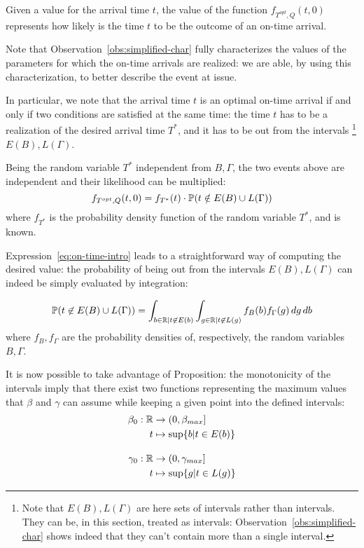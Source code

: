 Given a value for the arrival time \(t\),
the value of the function \(f_{T^{opt}, Q}(t, 0)\) represents how likely is the time \(t\) to be the outcome of an on-time arrival.

Note that Observation~\ref{obs:simplified-char} fully characterizes the values of the parameters for which the on-time arrivals are realized:
we are able, by using this characterization, to better describe the event at issue.

In particular, we note that the arrival time \(t\) is an optimal on-time arrival if and only if two conditions are satisfied at the same time:
the time \(t\) has to be a realization of the desired arrival time \(T^*\),
and it has to  be out from the intervals
\footnote{
  Note that \(E(B), L(\Gamma)\) are here sets of intervals rather than intervals.
  They can be, in this section, treated as intervals:
  Observation~\ref{obs:simplified-char} shows indeed that they can't contain more than a single interval.
}
\(E(B), L(\Gamma)\).

Being the random variable \(T^*\) independent from \(B, \Gamma\),
the two events above are independent and their likelihood can be multiplied:
\begin{equation}
  \label{eq:on-time-intro}
  f_{T^{opt}, Q}(t, 0) = f_{T^*}(t) \cdot \mathbb{P}(t \notin E(B) \cup L(\Gamma))
\end{equation}
where \(f_{T^*}\) is the probability density function of the random variable \(T^*\), and is known.

Expression~\eqref{eq:on-time-intro} leads to a straightforward way of computing the desired value:
the probability of being out from the intervals \(E(B), L(\Gamma)\) can indeed be simply evaluated by integration:

\begin{equation}
  \label{eq:prob-not-intervals}
  \mathbb{P}( t \not\in E(B) \cup L(\Gamma)) = \int_{b\in \mathbb{R} \vert t \not\in E(b)}\int_{g \in \mathbb{R} \vert t \not\in L(g)}f_B(b)f_\Gamma(g)\, dg\, db
\end{equation}
where \(f_B, f_\Gamma\) are the probability densities of, respectively, the random variables \(B, \Gamma\).


It is now possible to take advantage of Proposition:
the monotonicity of the intervals imply that there exist two functions representing the maximum values that \(\beta\) and \(\gamma\) can assume while keeping a given point into the defined intervals:
\begin{equation}
  \label{eq:def_b_0_g_0}
  \begin{split}
    \beta_0:\mathbb{R}&\rightarrow(0, \beta_{max}] \\
    t&\mapsto \sup\{b | t \in E(b)\} \\[1em]
    \gamma_0:\mathbb{R}&\rightarrow(0, \gamma_{max}] \\
    t&\mapsto \sup\{g | t \in L(g)\}
  \end{split}
\end{equation}

